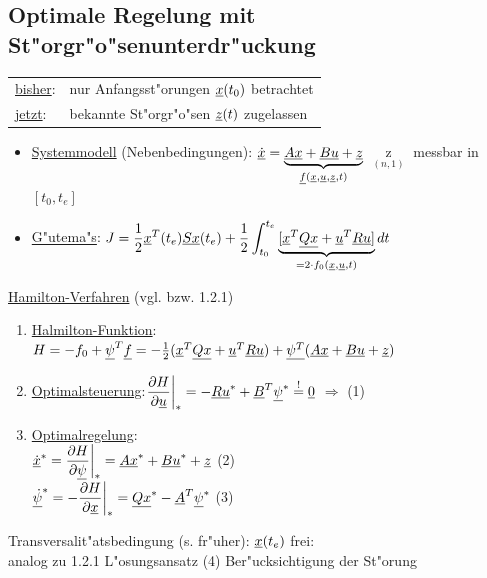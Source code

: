 \documentclass[openany,a4paper,11pt]{book}
\begin{document}
\subsection{Optimale Regelung mit St"orgr"o"senunterdr"uckung}
\begin{tabular}{ll}
    \uline{bisher}:& nur Anfangsst"orungen $\uline{x}(t_0)$ betrachtet \\
    \uline{jetzt}: & bekannte St"orgr"o"sen $\uline{z}(t)$ zugelassen
\end{tabular}
\begin{itemize}
    \item \uline{Systemmodell} (Nebenbedingungen): \quad $\uline{\dot{x}}=\underbrace{\uline{Ax}+\uline{Bu}+\uline{z}}_{\uline{f}(\uline{x},\uline{u},\uline{z},t)}$ \quad $\mathop{z(t)}\limits_{(n,1)}$ messbar in $[t_0, t_e]$
    \item \uline{G"utema"s}: \quad $\displaystyle J=\frac{1}{2}\uline{x}^T(t_e)\uline{Sx}(t_e)+\frac{1}{2}\int^{t_e}_{t_0}\underbrace{[\uline{x}^T\uline{Qx}+\uline{u}^T\uline{Ru}]}_{=2\cdot f_0(\uline{x},\uline{u},t)}dt$
\end{itemize}
\uline{Hamilton-Verfahren} (vgl.  bzw. 1.2.1) \begin{enumerate}
    \item \uline{Halmilton-Funktion}:\quad $H=-f_0+\uline{\psi}^T\uline{f}=-\frac{1}{2}(\uline{x}^T\uline{Qx}+\uline{u}^T\uline{Ru})+\uline{\psi^T}(\uline{Ax}+\uline{Bu}+\uline{z})$
    \item \uline{Optimalsteuerung}:\quad $\displaystyle\frac{\partial H}{\partial \uline{u}}\bigg|_*=-\uline{Ru}^*+\uline{B}^T\uline{\psi}^*\stackrel{!}{=}\uline{0}$ $\Rightarrow$  \quad (1)
    \item \uline{Optimalregelung}:\\[3pt]
    $\displaystyle\uline{\dot{x}}^*=\frac{\partial H}{\partial \uline{\psi}}\bigg|_*=\uline{Ax}^*+\uline{Bu}^*+\uline{z}$ \quad (2)\\
    $\displaystyle\uline{\dot{\psi}}^*=-\frac{\partial H}{\partial \uline{x}}\bigg|_*=\uline{Qx}^*-\uline{A}^T\uline{\psi}^*$ \quad (3)
\end{enumerate}
Transversalit"atsbedingung (s. fr"uher): \quad $\uline{x}(t_e)$ frei: \quad {}\\
analog zu 1.2.1 L"osungsansatz
\center {} \quad (4) \quad Ber"ucksichtigung der St"orung
\end{document}
